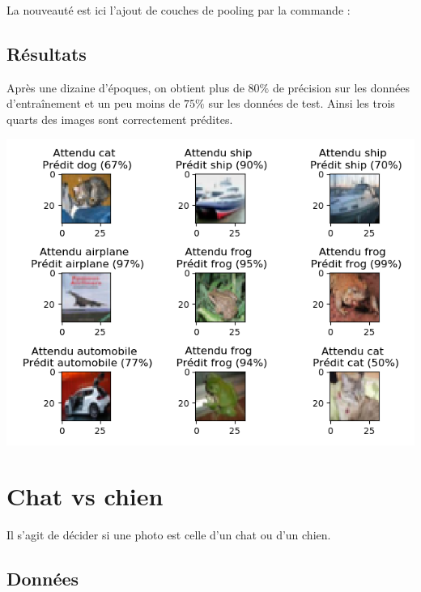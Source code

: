 \documentclass[11pt,class=report,crop=false]{standalone}
\begin{document}
La nouveauté est ici l'ajout de couches de pooling par la commande :

\subsection{Résultats}

Après une dizaine d'époques, on obtient plus de $80\%$ de précision sur les données d'entraînement et un peu moins de $75\%$ sur les données de test. Ainsi les trois quarts des images sont correctement prédites.

\begin{center}
\includegraphics[scale=\myscale,scale=0.8]{figures/tfconv-images-test}
\end{center}



\section{Chat vs chien}

Il s'agit de décider si une photo est celle d'un chat ou d'un chien.

\subsection{Données}
\end{document}
